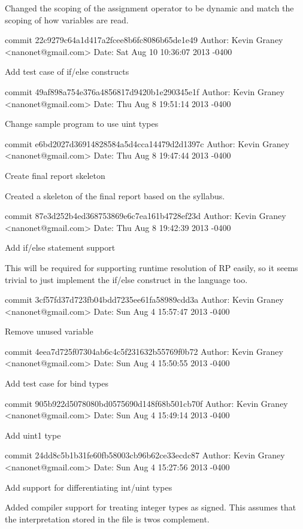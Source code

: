    Changed the scoping of the assignment operator to be dynamic
    and match the scoping of how variables are read.

commit 22c9279c64a1d417a2fcee8b6fc8086b65de1e49
Author: Kevin Graney <nanonet@gmail.com>
Date:   Sat Aug 10 10:36:07 2013 -0400

    Add test case of if/else constructs

commit 49af898a754e376a4856817d9420b1e290345e1f
Author: Kevin Graney <nanonet@gmail.com>
Date:   Thu Aug 8 19:51:14 2013 -0400

    Change sample program to use uint types

commit e6bd2027d36914828584a5d4cca14479d2d1397c
Author: Kevin Graney <nanonet@gmail.com>
Date:   Thu Aug 8 19:47:44 2013 -0400

    Create final report skeleton
    
    Created a skeleton of the final report based on the syllabus.

commit 87e3d252b4ed368753869e6c7ea161b4728ef23d
Author: Kevin Graney <nanonet@gmail.com>
Date:   Thu Aug 8 19:42:39 2013 -0400

    Add if/else statement support
    
    This will be required for supporting runtime resolution of RP
    easily, so it seems trivial to just implement the if/else construct
    in the language too.

commit 3cf57fd37d723fb04bdd7235ee61fa58989cdd3a
Author: Kevin Graney <nanonet@gmail.com>
Date:   Sun Aug 4 15:57:47 2013 -0400

    Remove unused variable

commit 4eea7d725f07304ab6c4c5f231632b55769f0b72
Author: Kevin Graney <nanonet@gmail.com>
Date:   Sun Aug 4 15:50:55 2013 -0400

    Add test case for bind types

commit 905b922d5078080bd0575690d148f68b501cb70f
Author: Kevin Graney <nanonet@gmail.com>
Date:   Sun Aug 4 15:49:14 2013 -0400

    Add uint1 type

commit 24dd8c5b1b31fe60fb58003cb96b62ce33ecdc87
Author: Kevin Graney <nanonet@gmail.com>
Date:   Sun Aug 4 15:27:56 2013 -0400

    Add support for differentiating int/uint types
    
    Added compiler support for treating integer types as signed.  This
    assumes that the interpretation stored in the file is twos
    complement.

